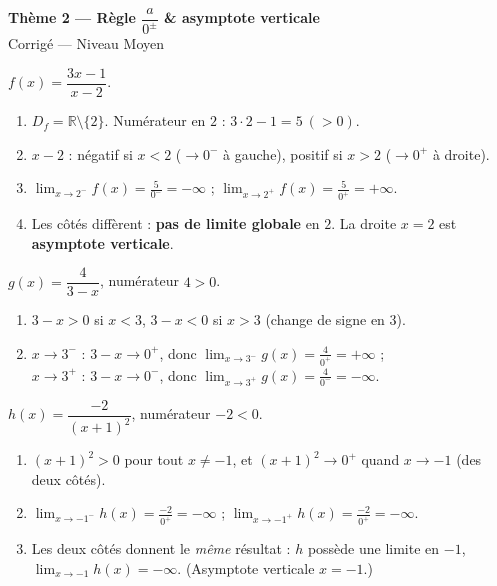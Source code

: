 \documentclass[11pt,a4paper]{article}
\newcommand{\R}{\mathbb{R}}
\begin{document}
\begin{center}
{\Large\bfseries\color{primarydark}Thème 2 — Règle $\dfrac{a}{0^{\pm}}$ \& asymptote verticale}\\[2pt]
{\large\color{excol}Corrigé — Niveau Moyen}
\end{center}
\vspace{6pt}

\begin{correction}
$f(x)=\dfrac{3x-1}{x-2}$.
\begin{enumerate}[label=\alph*),leftmargin=2em,itemsep=3pt]
  \item $D_f=\R\setminus\{2\}$. Numérateur en $2$ : $3\cdot 2-1=5\ (>0)$.
  \item $x-2$ : négatif si $x<2$ ($\to 0^{-}$ à gauche), positif si $x>2$ ($\to 0^{+}$ à droite).
  \item $\displaystyle\lim_{x\to 2^{-}} f(x)=\frac{5}{0^{-}}=-\infty$ ; \quad
        $\displaystyle\lim_{x\to 2^{+}} f(x)=\frac{5}{0^{+}}=+\infty$.
  \item Les côtés diffèrent : \textbf{pas de limite globale} en $2$. La droite $x=2$ est
        \textbf{asymptote verticale}.
\end{enumerate}
\end{correction}

\begin{correction}
$g(x)=\dfrac{4}{3-x}$, numérateur $4>0$.
\begin{enumerate}[label=\alph*),leftmargin=2em,itemsep=3pt]
  \item $3-x>0$ si $x<3$, $3-x<0$ si $x>3$ (change de signe en $3$).
  \item $x\to 3^{-}$ : $3-x\to 0^{+}$, donc $\displaystyle\lim_{x\to 3^{-}} g(x)=\frac{4}{0^{+}}=+\infty$ ;\\
        $x\to 3^{+}$ : $3-x\to 0^{-}$, donc $\displaystyle\lim_{x\to 3^{+}} g(x)=\frac{4}{0^{-}}=-\infty$.
\end{enumerate}
\end{correction}

\begin{correction}
$h(x)=\dfrac{-2}{(x+1)^2}$, numérateur $-2<0$.
\begin{enumerate}[label=\alph*),leftmargin=2em,itemsep=3pt]
  \item $(x+1)^2>0$ pour tout $x\neq -1$, et $(x+1)^2\to 0^{+}$ quand $x\to -1$ (des deux côtés).
  \item $\displaystyle\lim_{x\to -1^{-}} h(x)=\frac{-2}{0^{+}}=-\infty$ ; \quad
        $\displaystyle\lim_{x\to -1^{+}} h(x)=\frac{-2}{0^{+}}=-\infty$.
  \item Les deux côtés donnent le \emph{même} résultat : $h$ possède une limite en $-1$,
        $\displaystyle\lim_{x\to -1} h(x)=-\infty$. (Asymptote verticale $x=-1$.)
\end{enumerate}
\end{correction}
\end{document}
